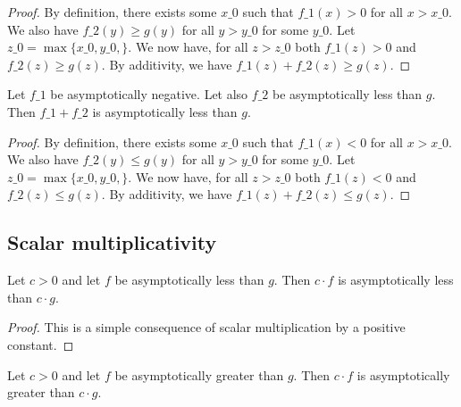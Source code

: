 \begin{proof}
    \leanok
    By definition, there exists some $x\_0$ such that $f\_1(x) > 0$ for all $x > x\_0$.
    We also have $f\_2(y) \ge g(y)$ for all $y > y\_0$ for some $y\_0$. Let
    $z\_0 = \max \{ x\_0, y\_0, \}$. We now have, for all $z > z\_0$ both $f\_1(z) > 0$
    and $f\_2(z) \ge g(z)$. By additivity, we have $f\_1(z) + f\_2(z) \ge g(z)$. 
\end{proof}

\begin{lemma}
    \label{lemma:asymp_le_add_neg}
    \leanok
    Let $f\_1$ be asymptotically negative. Let also $f\_2$ be asymptotically less 
    than $g$. Then $f\_1 + f\_2$ is asymptotically less than $g$.
\end{lemma}

\begin{proof}
    \leanok
    By definition, there exists some $x\_0$ such that $f\_1(x) < 0$ for all $x > x\_0$.
    We also have $f\_2(y) \le g(y)$ for all $y > y\_0$ for some $y\_0$. Let
    $z\_0 = \max \{ x\_0, y\_0, \}$. We now have, for all $z > z\_0$ both $f\_1(z) < 0$
    and $f\_2(z) \le g(z)$. By additivity, we have $f\_1(z) + f\_2(z) \le g(z)$. 
\end{proof}


\subsection{Scalar multiplicativity}

\begin{lemma}
    \label{lemma:asymp_le_pos_smul}
    \leanok
    Let $c > 0$ and let $f$ be asymptotically less than $g$. Then $c \cdot f$ is asymptotically
    less than $c \cdot g$.
\end{lemma}

\begin{proof}
    \leanok
    This is a simple consequence of scalar multiplication by a positive constant.
\end{proof}

\begin{lemma}
    \label{lemma:asymp_ge_pos_smul}
    \leanok
    Let $c > 0$ and let $f$ be asymptotically greater than $g$. Then $c \cdot f$ is asymptotically
    greater than $c \cdot g$.
\end{lemma}

